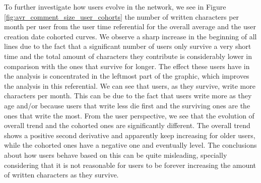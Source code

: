 
To further investigate how users evolve in the network, we see in Figure \ref{fig:avr_comment_size_user_cohorts} the number of written characters per month per user from the user time referential for the overall average and the user creation date cohorted curves. We observe a sharp increase in the beginning of all lines due to the fact that a significant number of users only survive a very short time and the total amount of characters they contribute is considerably lower in comparison with the ones that survive for longer. The effect these users have in the analysis is concentrated in the leftmost part of the graphic, which improves the analysis in this referential. We can see that users, as they survive, write more characters per month. This can be due to the fact that users write more as they age and/or because users that write less die first and the surviving ones are the ones that write the most. From the user perspective, we see that the evolution of overall trend and the cohorted ones are significantly different. The overall trend shows a positive second derivative and apparently keep increasing for older users, while the cohorted ones have a negative one and eventually level. The conclusions about how users behave based on this can be quite misleading, specially considering that it is not reasonable for users to be forever increasing the amount of written characters as they survive.

